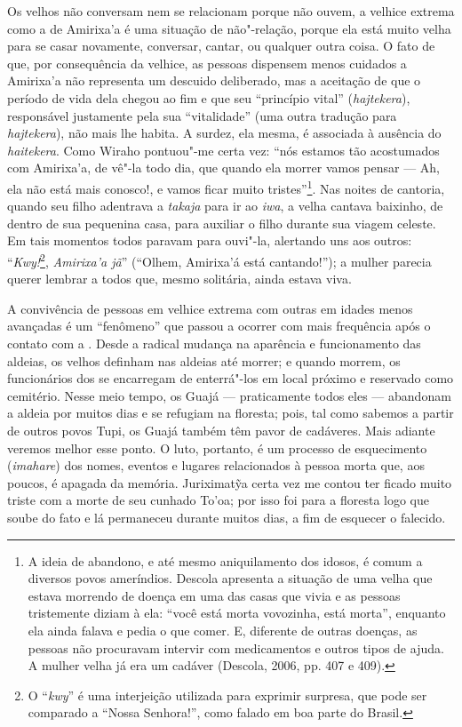 Os velhos não conversam nem se relacionam porque não ouvem, a velhice
extrema como a de Amirixa'a é uma situação de não"-relação, porque ela
está muito velha para se casar novamente, conversar, cantar, ou qualquer
outra coisa. O fato de que, por consequência da velhice, as pessoas
dispensem menos cuidados a Amirixa'a não representa um descuido
deliberado, mas a aceitação de que o período de vida dela chegou ao fim
e que seu ``princípio vital'' (\emph{hajtekera}), responsável justamente
pela sua ``vitalidade'' (uma outra tradução para \emph{hajtekera}), não
mais lhe habita. A surdez, ela mesma, é associada à ausência do
\emph{haitekera}. Como Wiraho pontuou"-me certa vez: ``nós estamos tão
acostumados com Amirixa'a, de vê"-la todo dia, que quando ela morrer
vamos pensar --- Ah, ela não está mais conosco!, e vamos ficar muito
tristes''\footnote{A ideia de abandono, e até mesmo aniquilamento dos
  idosos, é comum a diversos povos ameríndios. Descola apresenta a
  situação de uma velha que estava morrendo de doença em uma das casas
  que vivia e as pessoas tristemente diziam à ela: ``você está morta
      vovozinha, está morta'', enquanto ela ainda falava e pedia o que comer.
  E, diferente de outras doenças, as pessoas não procuravam intervir com
  medicamentos e outros tipos de ajuda. A mulher velha já era um cadáver
  (Descola, 2006, pp. 407 e 409).}. Nas noites de cantoria, quando seu filho
adentrava a \emph{takaja} para ir ao \emph{iwa}, a velha cantava
baixinho, de dentro de sua pequenina casa, para auxiliar o filho durante
sua viagem celeste. Em tais momentos todos paravam para ouvi"-la,
alertando uns aos outros: ``\emph{Kwy!}\footnote{O ``\emph{kwy}'' é uma
  interjeição utilizada para exprimir surpresa, que pode ser comparado a
  ``Nossa Senhora!'', como falado em boa parte do Brasil.},
\emph{Amirixa'a jã}'' (``Olhem, Amirixa'á está cantando!''); a mulher
parecia querer lembrar a todos que, mesmo solitária, ainda estava viva.

A convivência de pessoas em velhice extrema com outras em idades menos
avançadas é um ``fenômeno'' que passou a ocorrer com mais frequência após
o contato com a . Desde a radical mudança na aparência e
funcionamento das aldeias, os velhos definham nas aldeias até morrer; e
quando morrem, os funcionários dos  se encarregam de enterrá"-los em
local próximo e reservado como cemitério. Nesse meio tempo, os Guajá ---
praticamente todos eles --- abandonam a aldeia por muitos dias e se
refugiam na floresta; pois, tal como sabemos a partir de outros povos
Tupi, os Guajá também têm pavor de cadáveres. Mais adiante veremos
melhor esse ponto. O luto, portanto, é um processo de esquecimento
(\emph{imahare}) dos nomes, eventos e lugares relacionados à pessoa
morta que, aos poucos, é apagada da memória. Juriximatỹa certa vez me
contou ter ficado muito triste com a morte de seu cunhado To'oa; por
isso foi para a floresta logo que soube do fato e lá permaneceu durante
muitos dias, a fim de esquecer o falecido.

